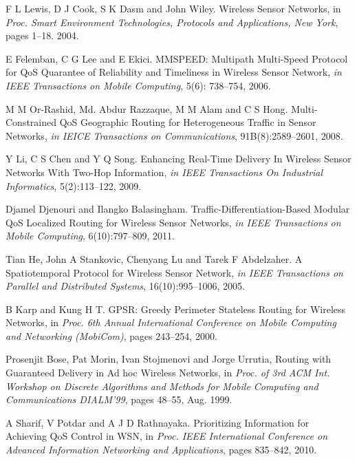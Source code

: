 \documentclass[fleqn,twoside]{article}
\begin{document}
\begin{thebibliography}{37}





{F  L Lewis, D J Cook, S K Dasm and John Wiley}. {Wireless Sensor
  Networks}, in \emph{Proc. Smart Environment Technologies, Protocols and
  Applications, New York},  pages 1--18. 2004.

{E Felemban, C G Lee and E Ekici}. {MMSPEED: Multipath Multi-Speed
  Protocol for QoS Quarantee of Reliability and Timeliness in Wireless Sensor
  Network}, \emph{in IEEE Transactions on Mobile Computing}, 5(6): 738--754, 2006.

{M M Or-Rashid, Md. Abdur Razzaque, M M Alam and C S Hong}.
  {Multi-Constrained QoS Geographic Routing for Heterogeneous Traffic in
  Sensor Networks}, \emph{in IEICE Transactions on Communications}, 91B(8):2589--2601, 2008.

{Y Li, C S Chen and Y Q Song}. {Enhancing Real-Time Delivery In Wireless
  Sensor Networks With Two-Hop Information}, \emph{in IEEE Transactions On
  Industrial Informatics}, 5(2):113--122, 2009.

{Djamel Djenouri and Ilangko Balasingham}. {Traffic-Differentiation-Based
  Modular QoS Localized Routing for Wireless Sensor Networks}, \emph{in IEEE
  Transactions on Mobile Computing}, 6(10):797--809, 2011.

{Tian He, John A Stankovic, Chenyang Lu and Tarek F Abdelzaher}. {A
  Spatiotemporal Protocol for Wireless Sensor Network}, \emph{in IEEE
  Transactions on Parallel and Distributed Systems}, 16(10):995--1006, 2005.

{B Karp and Kung H T}. {GPSR: Greedy Perimeter Stateless Routing for
  Wireless Networks}, in \emph{Proc. 6th Annual International Conference on
  Mobile Computing and Networking (MobiCom)},  pages 243--254, 2000.

{Prosenjit Bose, Pat Morin, Ivan Stojmenovi and Jorge Urrutia}, {Routing
  with Guaranteed Delivery in Ad hoc Wireless Networks}, in \emph{Proc. of
  3rd ACM Int. Workshop on Discrete Algorithms and Methods for Mobile Computing
  and Communications DIALM'99},  pages 48--55, Aug. 1999.

{A Sharif, V Potdar and A J D Rathnayaka}. {Prioritizing Information for
  Achieving QoS Control in WSN}, in \emph{Proc. IEEE International Conference
  on Advanced Information Networking and Applications},  pages 835--842, 2010.


\end{thebibliography}
\end{document}
